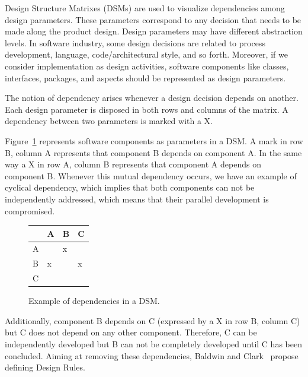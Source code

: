 Design Structure Matrixes (DSMs) are used to visualize dependencies among design
parameters. These parameters correspond to any decision that needs to be made along
the product design.
Design parameters may have different abstraction levels. In software industry,
some design decisions are related to process development, language, code/architectural
style, and so forth. Moreover, if we consider implementation as design activities, software
components like classes, interfaces, packages, and aspects should be represented as design
parameters.

The notion of dependency arises whenever a design decision depends on another.
Each design parameter is disposed in both rows and columns of the matrix. A dependency 
between two parameters is marked with a X.

Figure~\ref{dsm:example} represents software components as parameters in a DSM. A mark in row
B, column A represents that component B depends on component A. In the same way a X
in row A, column B represents that component A depends on component B. Whenever this
mutual dependency occurs, we have an example of cyclical dependency, which implies
that both components can not be independently addressed, which means that their parallel
development is compromised.

\begin{figure}[h]
    \begin{center}
           \begin{scriptsize}
            \begin{tabular}{|l|l|l|l|} \hline
                        & A     & B    & C 	\\ \hline
                A      &        &  x    &   	\\ \hline
                B 	&  x    &       &  x 	\\ \hline
                C	&        &       &   	\\ \hline
            \end{tabular}
            \end{scriptsize}
            \label{dsm:example}
        \caption{Example of dependencies in a DSM.}
    \end{center}
\end{figure}

Additionally, component B depends on C (expressed by a X in row B, column
C) but C does not depend on any other component. Therefore, C can be independently
developed but B can not be completely developed until C has been concluded. Aiming
at removing these dependencies, Baldwin and Clark~\cite{clark-design-rules-book} propose
defining Design Rules.

